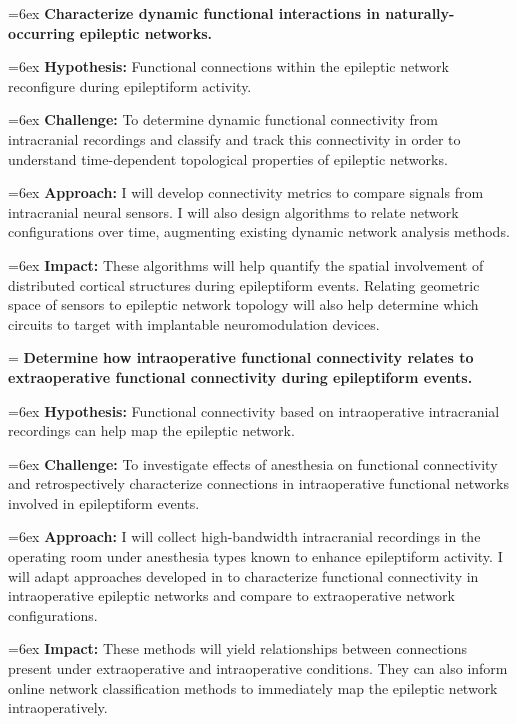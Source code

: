 


\hangindent=6ex
\noindent
{} \textbf{Characterize dynamic functional interactions in naturally-occurring epileptic networks.}

\hangindent=6ex
\textbf{Hypothesis:} Functional connections within the epileptic network reconfigure during epileptiform activity.

\hangindent=6ex
\textbf{Challenge:} To determine dynamic functional connectivity from intracranial recordings and classify and track this connectivity in order to understand time-dependent topological properties of epileptic networks.

\hangindent=6ex
\textbf{Approach:} I will develop connectivity metrics to compare signals from intracranial neural sensors. I will also design algorithms to relate network configurations over time, augmenting existing dynamic network analysis methods.

\hangindent=6ex
\textbf{Impact:} These algorithms will help quantify the spatial involvement of distributed cortical structures during epileptiform events. Relating geometric space of sensors to epileptic network topology will also help determine which circuits to target with implantable neuromodulation devices.


\hangindent=\parindent
{}
\noindent
{} \textbf{Determine how intraoperative functional connectivity relates to extraoperative functional connectivity during epileptiform events.}

\hangindent=6ex
\textbf{Hypothesis:} Functional connectivity based on intraoperative intracranial recordings can help map the epileptic network.

\hangindent=6ex
\textbf{Challenge:} To investigate effects of anesthesia on functional connectivity and retrospectively characterize connections in intraoperative functional networks involved in epileptiform events.

\hangindent=6ex
\textbf{Approach:} I will collect high-bandwidth intracranial recordings in the operating room under anesthesia types known to enhance epileptiform activity. I will adapt approaches developed in  to characterize functional connectivity in intraoperative epileptic networks and compare to extraoperative network configurations.

\hangindent=6ex
\textbf{Impact:} These methods will yield relationships between connections present under extraoperative and intraoperative conditions. They can also inform online network classification methods to immediately map the epileptic network intraoperatively.


